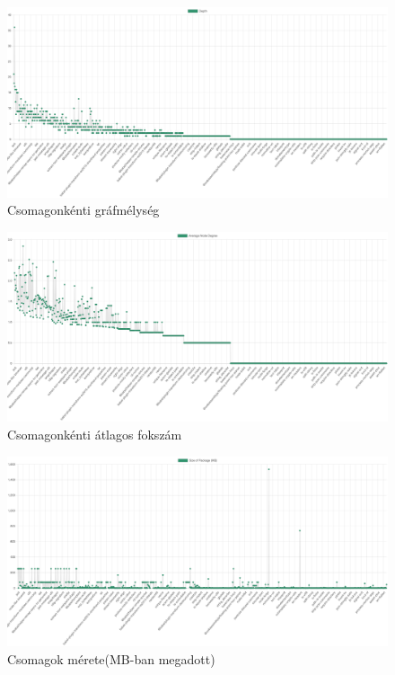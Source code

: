 \begin{figure}[!h]
	\centering
	\includegraphics[scale=0.12]{images/graphdepth.png}
	\caption{Csomagonkénti gráfmélység}
	\label{fig:graphdepth}
\end{figure}

\begin{figure}[!h]
	\centering
	\includegraphics[scale=0.12]{images/avgdegree.png}
	\caption{Csomagonkénti átlagos fokszám}
	\label{fig:avgdegree}
\end{figure}

\begin{figure}[!h]
	\centering
	\includegraphics[scale=0.12]{images/pkgsize.png}
	\caption{Csomagok mérete(MB-ban megadott)}
	\label{fig:pkgsize}
\end{figure}


